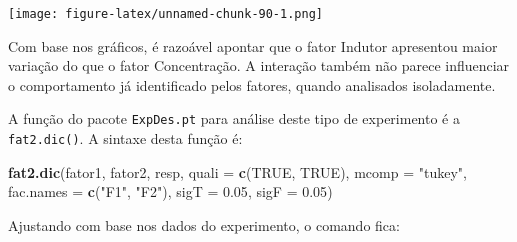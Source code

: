 \documentclass[
]{article}
\newenvironment{Shaded}{\begin{snugshade}}{\end{snugshade}}
\newcommand{\DataTypeTok}[1]{\textcolor[rgb]{0.13,0.29,0.53}{#1}}
\newcommand{\FloatTok}[1]{\textcolor[rgb]{0.00,0.00,0.81}{#1}}
\newcommand{\KeywordTok}[1]{\textcolor[rgb]{0.13,0.29,0.53}{\textbf{#1}}}
\newcommand{\NormalTok}[1]{#1}
\newcommand{\OperatorTok}[1]{\textcolor[rgb]{0.81,0.36,0.00}{\textbf{#1}}}
\newcommand{\OtherTok}[1]{\textcolor[rgb]{0.56,0.35,0.01}{#1}}
\newcommand{\StringTok}[1]{\textcolor[rgb]{0.31,0.60,0.02}{#1}}
\begin{document}
\begin{Shaded}
\end{Shaded}

\texttt{[image: figure-latex/unnamed-chunk-90-1.png]}

Com base nos gráficos, é razoável apontar que o fator Indutor apresentou maior variação do que o fator Concentração. A interação também não parece influenciar o comportamento já identificado pelos fatores, quando analisados isoladamente.

A função do pacote \texttt{ExpDes.pt} para análise deste tipo de experimento é a \texttt{fat2.dic()}. A sintaxe desta função é:

\begin{Shaded}
\begin{Highlighting}[]
\KeywordTok{fat2.dic}\NormalTok{(fator1, fator2, resp, }\DataTypeTok{quali =} \KeywordTok{c}\NormalTok{(}\OtherTok{TRUE}\NormalTok{, }\OtherTok{TRUE}\NormalTok{), }
         \DataTypeTok{mcomp =} \StringTok{"tukey"}\NormalTok{, }\DataTypeTok{fac.names =} \KeywordTok{c}\NormalTok{(}\StringTok{"F1"}\NormalTok{, }\StringTok{"F2"}\NormalTok{), }
         \DataTypeTok{sigT =} \FloatTok{0.05}\NormalTok{, }\DataTypeTok{sigF =} \FloatTok{0.05}\NormalTok{)}
\end{Highlighting}
\end{Shaded}

Ajustando com base nos dados do experimento, o comando fica:

\begin{Shaded}
\end{Shaded}
\end{document}
